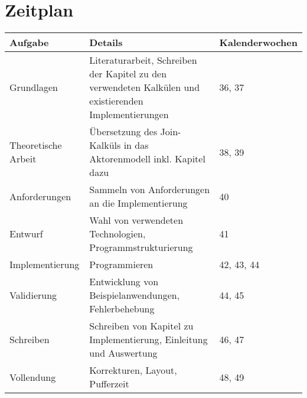 \documentclass[12pt]{article}
\begin{document}
\section*{Zeitplan}

\begin{tabular}{| p{3cm} | p{7cm} | p{3cm} |}
  \hline
    Aufgabe &
    Details &
    Kalenderwochen \\
  \hline
    Grundlagen &
    Literaturarbeit, Schreiben der Kapitel zu den verwendeten Kalkülen und existierenden Implementierungen &
    36, 37 \\
  \hline
    Theoretische \newline Arbeit &
    Übersetzung des Join-Kalküls in das Aktorenmodell inkl. Kapitel dazu &
    38, 39 \\
  \hline
    Anforderungen &
    Sammeln von Anforderungen an die Implementierung &
    40 \\
  \hline
    Entwurf &
    Wahl von verwendeten Technologien, Programmstrukturierung &
    41 \\
  \hline
    Implementierung &
    Programmieren &
    42, 43, 44 \\
  \hline
    Validierung &
    Entwicklung von Beispiel\-anwendungen, Fehlerbehebung &
    44, 45 \\
  \hline
    Schreiben &
    Schreiben von Kapitel zu Implementierung, Einleitung und Auswertung &
    46, 47 \\
  \hline
    Vollendung &
    Korrekturen, Layout, Pufferzeit &
    48, 49 \\
  \hline
\end{tabular}
\end{document}
